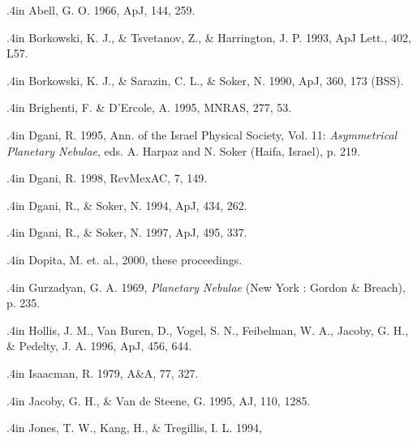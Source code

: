 \begin{references}
\par {} \noindent \hangindent .4in  Abell, G. O. 1966, ApJ, 144, 259.
\par {} \noindent \hangindent .4in  Borkowski, K. J., \& Tsvetanov, Z., \& Harrington, J. P. 1993,
ApJ Lett., 402, L57.
\par {} \noindent \hangindent .4in  Borkowski, K. J., \& Sarazin, C. L., \& Soker, N. 1990,
ApJ, 360, 173 (BSS).
\par {} \noindent \hangindent .4in  Brighenti, F. \& D'Ercole, A. 1995, MNRAS, 277, 53.
\par {} \noindent \hangindent .4in  Dgani, R. 1995,
Ann. of the Israel Physical Society, Vol. 11:
{\it Asymmetrical Planetary Nebulae},
eds. A. Harpaz and N. Soker (Haifa, Israel), p. 219.
\par {} \noindent \hangindent .4in  Dgani, R. 1998, RevMexAC, 7, 149.
\par {} \noindent \hangindent .4in  Dgani, R., \& Soker, N. 1994, ApJ, 434, 262.
\par {} \noindent \hangindent .4in  Dgani, R., \& Soker, N. 1997, ApJ, 495, 337.
\par {} \noindent \hangindent .4in  Dopita, M. et. al., 2000, these proceedings.
\par {} \noindent \hangindent .4in  Gurzadyan, G. A. 1969, {\it Planetary Nebulae}
(New York : Gordon \& Breach), p. 235.
\par {} \noindent \hangindent .4in  Hollis, J. M., Van Buren, D., Vogel, S. N., Feibelman, W. A., 
Jacoby, G. H., \& Pedelty, J. A. 1996, ApJ, 456, 644.
\par {} \noindent \hangindent .4in  Isaacman, R. 1979, A\&A, 77, 327.
\par {} \noindent \hangindent .4in  Jacoby, G. H., \& Van de Steene, G. 1995, AJ, 110, 1285.
\par {} \noindent \hangindent .4in  Jones, T. W., Kang, H., \& Tregillis, I. L. 1994,

\end{references}
